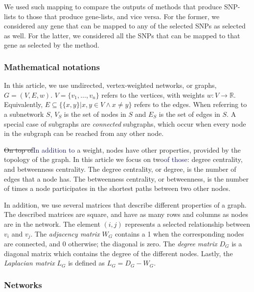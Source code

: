 \documentclass[twocolumn, 11pt]{article}
\newcommand{\caz}[2]{{\sout{#1}}\unskip\space\textcolor{MidnightBlue}{#2}}
\begin{document}
We used such mapping to compare the outputs of methods that produce SNP-lists to those that produce gene-lists, and vice versa. For the former, we considered any gene that can be mapped to any of the selected SNPs as selected as well. For the latter, we considered all the SNPs that can be mapped to that gene as selected by the method.

\subsubsection{Mathematical notations}
\label{methods:notation}
In this article, we use undirected, vertex-weighted networks, or graphs, $G = (V,E,w)$. $V = \{v_{1}, \dots{}, v_{n}\}$ refers to the vertices, with weights $w: V \rightarrow \mathbb{R}$. Equivalently, $E \subseteq \{\{x,y\} | x,y \in V \wedge x \neq y\}$ refers to the edges. When referring to a subnetwork $S$, $V_{S}$ is the set of nodes in $S$ and $E_{S}$ is the set of edges in $S$. A special case of subgraphs are \emph{connected} subgraphs, which occur when every node in the subgraph can be reached from any other node.

\caz{On top of}{In addition to} a weight, nodes have other properties, provided by the topology of the graph. In this article we focus on two\caz{}{of those}: degree centrality, and betweenness centrality. The degree centrality, or degree, is the number of edges that a node has. The betweenness centrality, or betweenness, is the number of times a node participates in the shortest paths between two other nodes.

In addition, we use several matrices that describe different properties of a graph. The described matrices are square, and have as many rows and columns as nodes are in the network. The element $(i,j)$ represents a  selected relationship between $v_i$ and $v_j$. The \emph{adjacency matrix} $W_G$ contains a 1 when the corresponding nodes are connected, and 0 otherwise; the diagonal is zero. The \emph{degree matrix} $D_G$ is a diagonal matrix which contains the degree of the different nodes. Lastly, the \emph{Laplacian matrix} $L_G$ is defined as $L_G = D_G - W_G$.

\subsubsection{Networks}
\label{methods:networks}
\end{document}
